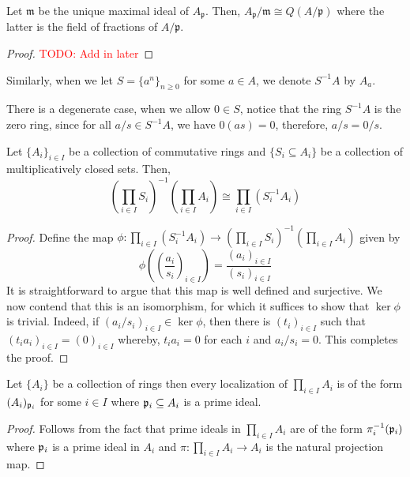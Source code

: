 \begin{proposition}
    Let $\mathfrak m$ be the unique maximal ideal of $A_{\mathfrak p}$. Then, $A_{\mathfrak p}/\mathfrak m\cong Q(A/\mathfrak p)$ where the latter is the field of fractions of $A/\mathfrak p$.
\end{proposition}
\begin{proof}
    \textcolor{red}{TODO: Add in later}
\end{proof}

Similarly, when we let $S = \{a^n\}_{n\ge 0}$ for some $a\in A$, we denote $S^{-1}A$ by $A_a$.

There is a degenerate case, when we allow $0\in S$, notice that the ring $S^{-1}A$ is the zero ring, since for all $a/s\in S^{-1}A$, we have $0(as) = 0$, therefore, $a/s = 0/s$.

\begin{proposition}
    Let $\{A_i\}_{i\in I}$ be a collection of commutative rings and $\{S_i\subseteq A_i\}$ be a collection of multiplicatively closed sets. Then, 
    \begin{equation*}
        \left(\prod_{i\in I}S_i\right)^{-1}\left(\prod_{i\in I}A_i\right)\cong\prod_{i\in I}(S_i^{-1}A_i)
    \end{equation*}
\end{proposition}
\begin{proof}
    Define the map $\phi: \prod_{i\in I}(S_i^{-1}A_i)\to\left(\prod_{i\in I}S_i\right)^{-1}\left(\prod_{i\in I}A_i\right)$ given by 
    \begin{equation*}
        \phi\left(\left(\frac{a_i}{s_i}\right)_{i\in I}\right) = \frac{(a_i)_{i\in I}}{(s_i)_{i\in I}}
    \end{equation*}
    It is straightforward to argue that this map is well defined and surjective. We now contend that this is an isomorphism, for which it suffices to show that $\ker\phi$ is trivial. Indeed, if $(a_i/s_i)_{i\in I}\in\ker\phi$, then there is $(t_i)_{i\in I}$ such that $(t_ia_i)_{i\in I} = (0)_{i\in I}$ whereby, $t_ia_i = 0$ for each $i$ and $a_i/s_i = 0$. This completes the proof.
\end{proof}

\begin{corollary}
    Let $\{A_i\}$ be a collection of rings then every localization of $\prod_{i\in I}A_i$ is of the form $(A_i)_{\mathfrak p_i}$ for some $i\in I$ where $\mathfrak p_i\subseteq A_i$ is a prime ideal.
\end{corollary}
\begin{proof}
    Follows from the fact that prime ideals in $\prod_{i\in I}A_i$ are of the form $\pi_i^{-1}(\mathfrak p_i)$ where $\mathfrak p_i$ is a prime ideal in $A_i$ and $\pi: \prod_{i\in I}A_i\to A_i$ is the natural projection map.
\end{proof}

